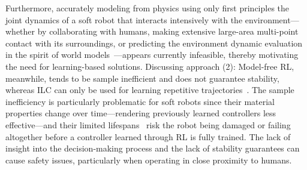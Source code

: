 Furthermore, accurately modeling from physics using only first principles the joint dynamics of a soft robot that interacts intensively with the environment—whether by collaborating with humans, making extensive large-area multi-point contact with its surroundings, or predicting the environment dynamic evaluation in the spirit of world models~\citep{ha2018world}—appears currently infeasible, thereby motivating the need for learning-based solutions.
Discussing approach (2): Model-free \gls{RL}, meanwhile, tends to be sample inefficient and does not guarantee stability, whereas \gls{ILC} can only be used for learning repetitive trajectories~\citep{bristow2006survey}. The sample inefficiency is particularly problematic for soft robots since their material properties change over time—rendering previously learned controllers less effective—and their limited lifespans~\citep{yasa2023overview} risk the robot being damaged or failing altogether before a controller learned through \gls{RL} is fully trained.
The lack of insight into the decision-making process and the lack of stability guarantees can cause safety issues, particularly when operating in close proximity to humans.

